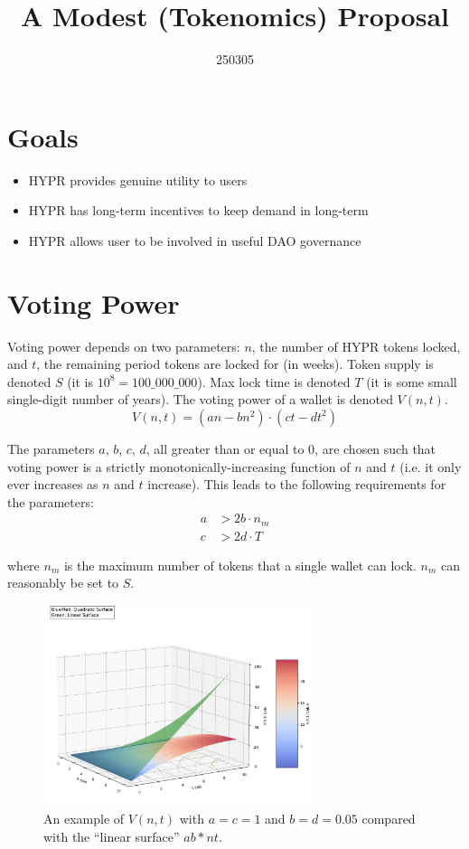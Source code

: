 \documentclass{article}
\title{A Modest (Tokenomics) Proposal}
\date{250305}
\author{}
\begin{document}
\maketitle

\section{Goals}
\begin{itemize}
    \item HYPR provides genuine utility to users
    \item HYPR has long-term incentives to keep demand in long-term
    \item HYPR allows user to be involved in useful DAO governance
\end{itemize}

\section{Voting Power}

Voting power depends on two parameters: $n$, the number of HYPR tokens locked, and $t$, the remaining period tokens are locked for (in weeks).
Token supply is denoted $S$ (it is $10^8 = 100\_000\_000$).
Max lock time is denoted $T$ (it is some small single-digit number of years).
The voting power of a wallet is denoted $V(n, t)$.
\begin{equation}
V(n, t) = (an - bn^2) \cdot (ct - dt^2)
\end{equation}

The parameters $a$, $b$, $c$, $d$, all greater than or equal to $0$, are chosen such that voting power is a strictly monotonically-increasing function of $n$ and $t$ (i.e. it only ever increases as $n$ and $t$ increase).
This leads to the following requirements for the parameters:
\begin{align}
a &> 2b \cdot n_m\\
c &> 2d \cdot T
\end{align}

where $n_m$ is the maximum number of tokens that a single wallet can lock.
$n_m$ can reasonably be set to $S$.

\begin{figure}[h]
    \centering
    \includegraphics[width=0.7\textwidth]{voting-power-surface.png}
    \caption{An example of $V(n, t)$ with $a = c = 1$ and $b = d = 0.05$ compared with the ``linear surface'' $ab * nt$.}
    \label{fig:example-image}
\end{figure}
\end{document}
